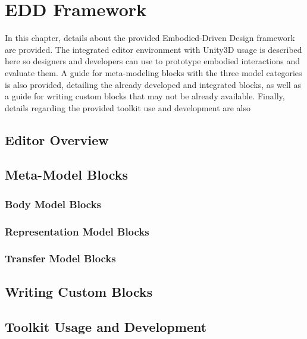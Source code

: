 
\chapter{EDD Framework}

In this chapter, details about the provided Embodied-Driven Design framework are provided. The integrated editor environment with Unity3D usage is described here so designers and developers can use to prototype embodied interactions and evaluate them. A guide for meta-modeling blocks with the three model categories is also provided, detailing the already developed and integrated blocks, as well as a guide for writing custom blocks that may not be already available. Finally, details regarding the provided toolkit use and development are also 

\section{Editor Overview}

\section{Meta-Model Blocks}
\subsection{Body Model Blocks}
\subsection{Representation Model Blocks}
\subsection{Transfer Model Blocks}


\section{Writing Custom Blocks}

\section{Toolkit Usage and Development}